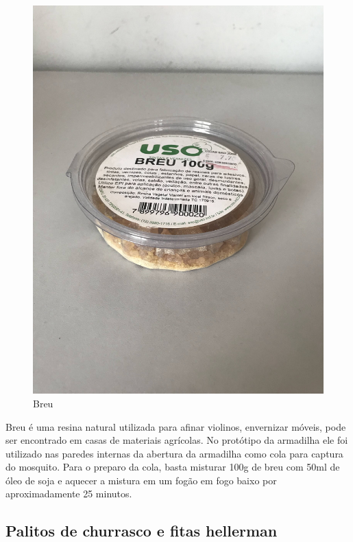 \documentclass[
	12pt,				%
	openright,			%
	oneside,			%
	a4paper,			%
	chapter=TITLE,		%
	english,			%
	brazil				%
	]{abntex2}
\begin{document}
\begin{figure}[H]
    \centering
    \includegraphics[scale=0.04, angle=-90]{imagens/IMG_0601.jpg}
    \caption{Breu}
    \label{fig:breu}
\end{figure}   

Breu é uma resina natural utilizada para afinar violinos, envernizar móveis, pode ser encontrado em casas de materiais agrícolas. 
No protótipo da armadilha ele foi utilizado nas paredes internas da abertura da armadilha como cola para captura do mosquito.
Para o preparo da cola, basta misturar 100g de breu com 50ml de óleo de soja e aquecer a mistura em um fogão em fogo baixo por
 aproximadamente 25 minutos.

\subsection{Palitos de churrasco e fitas hellerman}
\end{document}
